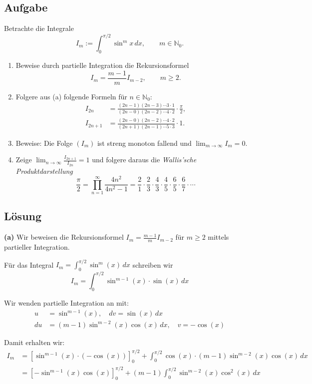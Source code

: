 \documentclass{article}
\begin{document}
\subsection*{Aufgabe}
Betrachte die Integrale
$$
   I_m := \int_0^{\pi/2}\sin^mx\,dx,\qquad m\in\mathbb{N}_0.
$$
\begin{enumerate}
\renewcommand{\labelenumi}{(\alph{enumi})}
\item Beweise durch partielle Integration die Rekursionsformel
$$
   I_m = \frac{m-1}{m}I_{m-2},\qquad m\geq 2.
$$
\item Folgere aus (a) folgende Formeln für $n\in\mathbb{N}_0$:
\begin{align*}
   I_{2n} &= \frac{(2n-1)(2n-3)\cdots 3\cdot 1}{(2n-0)(2n-2)\cdots 4\cdot 2}\cdot\frac{\pi}{2},\\
   I_{2n+1} &= \frac{(2n-0)(2n-2)\cdots 4\cdot 2}{(2n+1)(2n-1)\cdots 5\cdot 3}\cdot 1.
\end{align*}
\item Beweise: Die Folge $(I_m)$ ist streng monoton fallend und $\lim_{m\to\infty}I_m=0$.
\item Zeige $\lim_{n\to\infty}\frac{I_{2n+1}}{I_{2n}}=1$ und folgere
daraus die {\em Wallis'sche Produktdarstellung}
$$
   \frac{\pi}{2} = \prod_{n=1}^\infty \frac{4n^2}{4n^2-1} = \frac{2}{1} \cdot \frac{2}{3} \cdot \frac{4}{3} \cdot \frac{4}{5} \cdot \frac{6}{5} \cdot \frac{6}{7} \cdot \cdots
$$
\end{enumerate}

\subsection*{Lösung}

\textbf{(a)} Wir beweisen die Rekursionsformel $I_m = \frac{m-1}{m}I_{m-2}$ für $m \geq 2$ mittels partieller Integration.

Für das Integral $I_m = \int_0^{\pi/2} \sin^m(x) \, dx$ schreiben wir
$$I_m = \int_0^{\pi/2} \sin^{m-1}(x) \cdot \sin(x) \, dx$$

Wir wenden partielle Integration an mit:
\begin{align*}
u &= \sin^{m-1}(x), \quad dv = \sin(x) \, dx\\
du &= (m-1)\sin^{m-2}(x)\cos(x) \, dx, \quad v = -\cos(x)
\end{align*}

Damit erhalten wir:
\begin{align*}
I_m &= \left[\sin^{m-1}(x) \cdot (-\cos(x))\right]_0^{\pi/2} + \int_0^{\pi/2} \cos(x) \cdot (m-1)\sin^{m-2}(x)\cos(x) \, dx\\
&= \left[-\sin^{m-1}(x)\cos(x)\right]_0^{\pi/2} + (m-1)\int_0^{\pi/2} \sin^{m-2}(x)\cos^2(x) \, dx
\end{align*}
\end{document}
